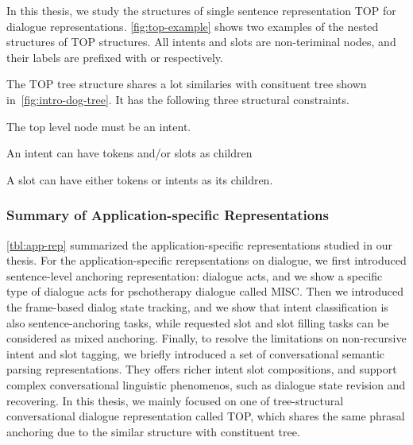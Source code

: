 In this thesis, we study the structures of single sentence
representation TOP for dialogue
representations. \autoref{fig:top-example} shows two examples of the
nested structures of TOP structures. All intents and slots are
non-teriminal nodes, and their labels are prefixed with  or
 respectively.

The TOP tree structure shares a lot similaries with consituent tree
shown in~\autoref{fig:intro-dog-tree}. It has the following three structural
constraints.
\begin{inparaenum}[(1)]
\item The top level node must be an intent.
\item An intent can have tokens and/or slots as children
\item A slot can have either tokens or intents as its children.
\end{inparaenum}

\subsubsection{Summary of Application-specific Representations}
\label{ssec:bg:summary-application-rep}
\autoref{tbl:app-rep} summarized the application-specific representations studied in our thesis. For the application-specific rerepsentations on dialogue, we first
introduced sentence-level anchoring representation: dialogue acts, and
we show a specific type of dialogue acts for pschotherapy dialogue
called MISC. Then we introduced the frame-based dialog state tracking,
and we show that intent classification is also sentence-anchoring
tasks, while requested slot and slot filling tasks can be considered
as mixed anchoring. Finally, to resolve the limitations on
non-recursive intent and slot tagging, we briefly introduced a set of
conversational semantic parsing representations. They offers richer
intent slot compositions, and support complex conversational
linguistic phenomenos, such as dialogue state revision and recovering.
In this thesis, we mainly focused on one of tree-structural
conversational dialogue representation called TOP, which shares the
same phrasal anchoring due to the similar structure with constituent
tree.

